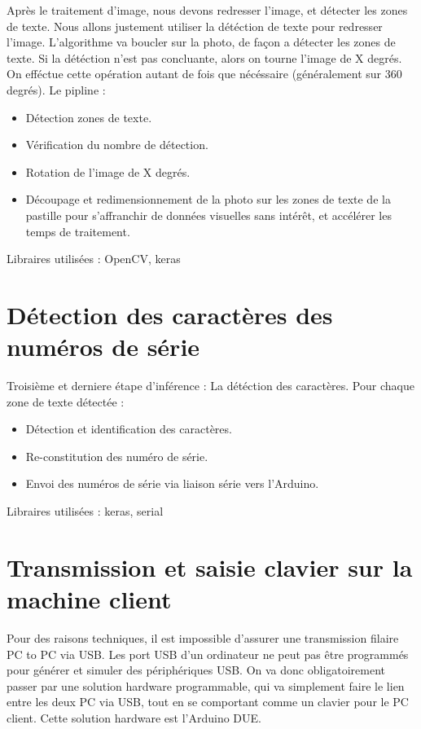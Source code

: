 Après le traitement d'image, nous devons redresser l'image, et détecter les zones de texte. Nous allons justement utiliser la détéction de texte pour redresser l'image. L'algorithme va boucler sur la photo, de façon a détecter les zones de texte. Si la détéction n'est pas concluante, alors on tourne l'image de X degrés. On efféctue cette opération autant de fois que nécéssaire (généralement sur 360 degrés).
Le pipline :
\begin{itemize}
    \item Détection zones de texte.
    \item Vérification du nombre de détection.
    \item Rotation de l'image de X degrés.
    \item Découpage et redimensionnement de la photo sur les zones de texte de la pastille pour s’affranchir de données visuelles sans intérêt, et accélérer les temps de traitement.
\end{itemize}

Libraires utilisées : OpenCV, keras

\section{Détection des caractères des numéros de série}

Troisième et derniere étape d'inférence : La détéction des caractères.
Pour chaque zone de texte détectée :
\begin{itemize}
    \item Détection et identification des caractères.
    \item Re-constitution des numéro de série.
    \item Envoi des numéros de série via liaison série vers l'Arduino.
\end{itemize}

Libraires utilisées : keras, serial

\section{Transmission et saisie clavier sur la machine client}

Pour des raisons techniques, il est impossible d’assurer une transmission filaire PC to PC via USB. Les port USB d’un ordinateur ne peut pas être programmés pour générer et simuler des périphériques USB. On va donc obligatoirement passer par une solution hardware programmable, qui va simplement faire le lien entre les deux PC via USB, tout en se comportant comme un clavier pour le PC client.
Cette solution hardware est l'Arduino DUE.

